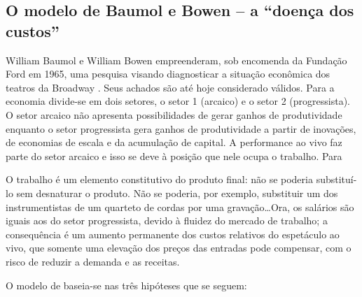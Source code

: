 \documentclass[a4paper, 12pt, openright, oneside, german, french, english, brazil]{abntex2}
\begin{document}
	\subsection{O modelo de Baumol e Bowen -- a ``doença dos custos''}
	
	William Baumol e William Bowen empreenderam, sob encomenda da Fundação Ford em 1965, uma pesquisa visando diagnosticar a situação econômica dos teatros da Broadway \cite{benhamou2007economia}. Seus achados são até hoje considerado válidos. Para  a economia divide-se em dois setores, o setor 1 (arcaico) e o setor 2 (progressista). O setor arcaico não apresenta possibilidades de gerar ganhos de produtividade enquanto o setor progressista gera ganhos de produtividade a partir de inovações, de economias de escala e da acumulação de capital. A performance ao vivo faz parte do setor arcaico e isso se deve à posição que nele ocupa o trabalho. Para 
	
	\begin{citacao}
		O trabalho é um elemento constitutivo do produto final: não se poderia substituí-lo sem desnaturar o produto. Não se poderia, por exemplo, substituir um dos instrumentistas de um quarteto de cordas por uma gravação\ldots Ora, os salários são iguais aos do setor progressista, devido à fluidez do mercado de trabalho; a consequência é um aumento permanente dos custos relativos do espetáculo ao vivo, que somente uma elevação dos preços das entradas pode compensar, com o risco de reduzir a demanda e as receitas. 
	\end{citacao}
	
	O modelo de  baseia-se nas três hipóteses que se seguem:
	
\end{document}

